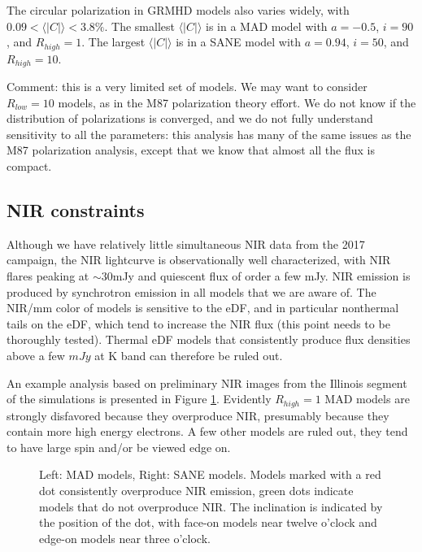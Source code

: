 \documentclass[twocolumn,tighten,dvipsnames]{aastex63}
\newcommand\<{{\langle}}
\renewcommand\>{{\rangle}} %
\begin{document}
The circular polarization in GRMHD models also varies widely, with  $0.09 < \<|C|\> < 3.8 \%$.  The smallest $\<|C|\>$ is in a MAD model with $a = -0.5$, $i = 90$, and $R_{high} = 1$.  The largest $\<|C|\>$ is in a SANE model with $a = 0.94$, $i = 50$, and $R_{high} = 10$.

Comment: this is a very limited set of models.  We may want to consider $R_{low} = 10$ models, as in the M87 polarization theory effort.   We do not know if the distribution of polarizations is converged, and we do not fully understand sensitivity to all the parameters: this analysis has many of the same issues as the M87 polarization analysis, except that we know that almost all the flux is compact.

\subsection{NIR constraints}
\label{sec:nirconst}

Although we have relatively little simultaneous NIR data from the 2017 campaign, the NIR lightcurve is observationally well characterized, with NIR flares peaking at $\sim 30$mJy and quiescent flux of order a few mJy.  NIR emission is produced by synchrotron emission in all models that we are aware of.  The NIR/mm color of models is sensitive to the eDF, and in particular nonthermal tails on the eDF, which tend to increase the NIR flux (this point needs to be thoroughly tested).  Thermal eDF models that consistently produce flux densities above a few $mJy$ at K band can therefore be ruled out.

An example analysis based on preliminary NIR images from the Illinois segment of the simulations is presented in Figure \ref{fig:NIRmodels}.  Evidently $R_{high} = 1$ MAD models are strongly disfavored because they overproduce NIR, presumably because they contain more high energy electrons.  A few other models are ruled out, they tend to have large spin and/or be viewed edge on.

\begin{figure}
    \centering
    \caption{Left: MAD models, Right: SANE models.  Models marked with a red dot consistently overproduce NIR emission, green dots indicate models that do not overproduce NIR.  The inclination is indicated by the position of the dot, with face-on models near twelve o'clock and edge-on models near three o'clock.}
    \label{fig:NIRmodels}
\end{figure}
\end{document}
